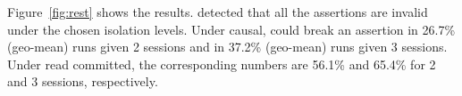 Figure~\ref{fig:rest} shows the results. 
\tool{} detected that all the assertions are invalid under the chosen isolation levels.
Under causal, \tool{} could break an assertion in 26.7\% (geo-mean) runs given 2 sessions and in 37.2\% (geo-mean) runs given 3 sessions.
Under read committed, the corresponding numbers are 56.1\% and 65.4\% for 2 and
3 sessions, respectively.

